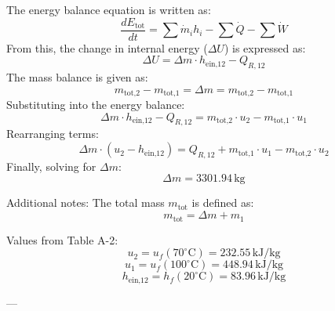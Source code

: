 The energy balance equation is written as:  
\[
\frac{dE_{\text{tot}}}{dt} = \sum \dot{m}_i h_i - \sum \dot{Q} - \sum \dot{W}
\]  
From this, the change in internal energy (\( \Delta U \)) is expressed as:  
\[
\Delta U = \Delta m \cdot h_{\text{ein,12}} - Q_{R,12}
\]  
The mass balance is given as:  
\[
m_{\text{tot,2}} - m_{\text{tot,1}} = \Delta m = m_{\text{tot,2}} - m_{\text{tot,1}}
\]  
Substituting into the energy balance:  
\[
\Delta m \cdot h_{\text{ein,12}} - Q_{R,12} = m_{\text{tot,2}} \cdot u_2 - m_{\text{tot,1}} \cdot u_1
\]  
Rearranging terms:  
\[
\Delta m \cdot (u_2 - h_{\text{ein,12}}) = Q_{R,12} + m_{\text{tot,1}} \cdot u_1 - m_{\text{tot,2}} \cdot u_2
\]  
Finally, solving for \( \Delta m \):  
\[
\Delta m = 3301.94 \, \text{kg}
\]  

Additional notes:  
The total mass \( m_{\text{tot}} \) is defined as:  
\[
m_{\text{tot}} = \Delta m + m_1
\]  

Values from Table A-2:  
\[
u_2 = u_f(70^\circ\text{C}) = 232.55 \, \text{kJ/kg}
\]  
\[
u_1 = u_f(100^\circ\text{C}) = 448.94 \, \text{kJ/kg}
\]  
\[
h_{\text{ein,12}} = h_f(20^\circ\text{C}) = 83.96 \, \text{kJ/kg}
\]  

---